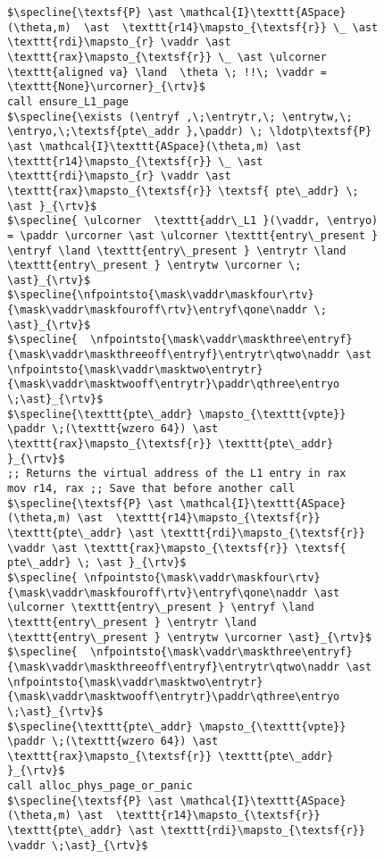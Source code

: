 \begin{figure}\footnotesize
  \begin{lstlisting}[mathescape]
$\specline{\textsf{P} \ast \mathcal{I}\texttt{ASpace}(\theta,m)  \ast  \texttt{r14}\mapsto_{\textsf{r}} \_ \ast \texttt{rdi}\mapsto_{r} \vaddr \ast \texttt{rax}\mapsto_{\textsf{r}} \_ \ast \ulcorner \texttt{aligned va} \land  \theta \; !!\; \vaddr = \texttt{None}\urcorner}_{\rtv}$
call ensure_L1_page
$\specline{\exists (\entryf ,\;\entrytr,\; \entrytw,\; \entryo,\;\textsf{pte\_addr },\paddr) \; \ldotp\textsf{P} \ast \mathcal{I}\texttt{ASpace}(\theta,m) \ast  \texttt{r14}\mapsto_{\textsf{r}} \_ \ast \texttt{rdi}\mapsto_{r} \vaddr \ast \texttt{rax}\mapsto_{\textsf{r}} \textsf{ pte\_addr} \; \ast }_{\rtv}$
$\specline{ \ulcorner  \texttt{addr\_L1 }(\vaddr, \entryo) = \paddr \urcorner \ast \ulcorner \texttt{entry\_present } \entryf \land \texttt{entry\_present } \entrytr \land  \texttt{entry\_present } \entrytw \urcorner \; \ast}_{\rtv}$
$\specline{\nfpointsto{\mask\vaddr\maskfour\rtv}{\mask\vaddr\maskfouroff\rtv}\entryf\qone\naddr \; \ast}_{\rtv}$ 
$\specline{  \nfpointsto{\mask\vaddr\maskthree\entryf}{\mask\vaddr\maskthreeoff\entryf}\entrytr\qtwo\naddr \ast \nfpointsto{\mask\vaddr\masktwo\entrytr}{\mask\vaddr\masktwooff\entrytr}\paddr\qthree\entryo \;\ast}_{\rtv}$
$\specline{\texttt{pte\_addr} \mapsto_{\texttt{vpte}} \paddr \;(\texttt{wzero 64}) \ast \texttt{rax}\mapsto_{\textsf{r}} \texttt{pte\_addr}  }_{\rtv}$
;; Returns the virtual address of the L1 entry in rax
mov r14, rax ;; Save that before another call
$\specline{\textsf{P} \ast \mathcal{I}\texttt{ASpace}(\theta,m) \ast  \texttt{r14}\mapsto_{\textsf{r}} \texttt{pte\_addr} \ast \texttt{rdi}\mapsto_{\textsf{r}} \vaddr \ast \texttt{rax}\mapsto_{\textsf{r}} \textsf{ pte\_addr} \; \ast }_{\rtv}$
$\specline{ \nfpointsto{\mask\vaddr\maskfour\rtv}{\mask\vaddr\maskfouroff\rtv}\entryf\qone\naddr \ast \ulcorner \texttt{entry\_present } \entryf \land \texttt{entry\_present } \entrytr \land  \texttt{entry\_present } \entrytw \urcorner \ast}_{\rtv}$ 
$\specline{  \nfpointsto{\mask\vaddr\maskthree\entryf}{\mask\vaddr\maskthreeoff\entryf}\entrytr\qtwo\naddr \ast \nfpointsto{\mask\vaddr\masktwo\entrytr}{\mask\vaddr\masktwooff\entrytr}\paddr\qthree\entryo \;\ast}_{\rtv}$
$\specline{\texttt{pte\_addr} \mapsto_{\texttt{vpte}} \paddr \;(\texttt{wzero 64}) \ast \texttt{rax}\mapsto_{\textsf{r}} \texttt{pte\_addr}  }_{\rtv}$
call alloc_phys_page_or_panic
$\specline{\textsf{P} \ast \mathcal{I}\texttt{ASpace}(\theta,m) \ast  \texttt{r14}\mapsto_{\textsf{r}} \texttt{pte\_addr} \ast \texttt{rdi}\mapsto_{\textsf{r}} \vaddr \;\ast}_{\rtv}$

\end{lstlisting}
\end{figure}
